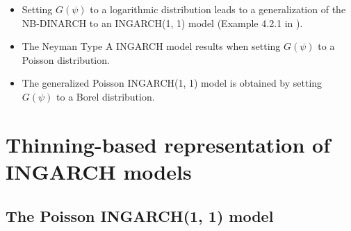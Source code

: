 \documentclass{article}
\begin{document}
\begin{itemize}
\item Setting $G(\psi)$ to a logarithmic distribution %
leads to a generalization of the NB-DINARCH \cite{Xu2012} to an INGARCH(1, 1) model (Example 4.2.1 in \cite{Weiss2018}). %
\item The Neyman Type A INGARCH model \cite{Goncalves2015a} results when setting $G(\psi)$ to a Poisson distribution. %
\item The generalized Poisson INGARCH(1, 1) model \cite{Zhu2012} is obtained by setting $G(\psi)$ to a Borel distribution. %
\end{itemize}

\section{Thinning-based representation of INGARCH models}%
\label{sec:alternative_formulation}

\subsection{The Poisson INGARCH(1, 1) model}
\label{subsec:poinsson11}
\end{document}
